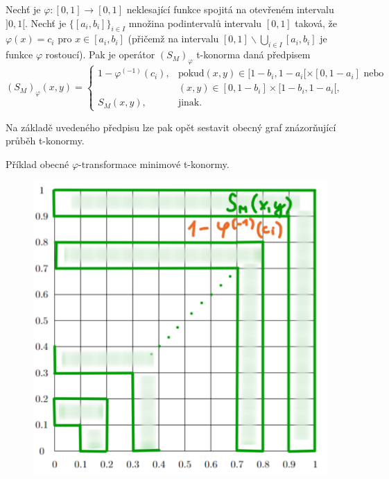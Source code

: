 \begin{sentence}
\cite{mitav}
    \label{t-conorm}
 Nech\v t je $\varphi:[0,1]\rightarrow [0,1]$
neklesající funkce spojitá na otevřeném intervalu $]0,1[$.
Nech\v t je $\{[a_i,b_i]\}_{i\in I}$ množina podinterval\r u
intervalu $[0,1]$ taková, že $\varphi(x)=c_i$ pro $x\in
[a_i,b_i]$ (přičemž na intervalu $[0,1]\backslash \bigcup \limits_{i \in I}
[a_i,b_i]$ je funkce $\varphi$
rostoucí).
Pak je operátor $(S_M)_{\varphi}$  t-konorma daná předpisem
$$ (S_M)_{\varphi}(x,y) = \begin{cases} 1-\varphi^{(-1)}(c_i), &\mbox {pokud
$(x,y)\in [1-b_i,1-a_i[\times[0,1-a_i]$ nebo}
\\ & (x,y)\in [0,1-b_i]\times[1-b_i,1-a_i[,
\\ S_M(x,y), &\mbox {jinak.}
\end{cases} $$
\end{sentence}

Na základě uvedeného předpisu lze pak opět sestavit obecný graf znázor\v nující pr\r uběh t-konormy.

\begin{graph}
    Příklad obecné $\varphi$-transformace minimové t-konormy.
    \begin{figure}[H]
                \hspace{-1cm}
                \includegraphics[scale=0.4]{template-fig/t-konorma.pdf}
                \centering
            \end{figure}
\end{graph}


